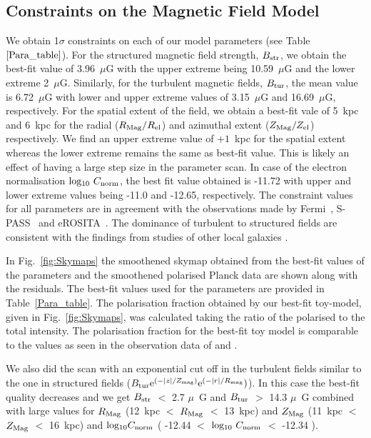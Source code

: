 \documentclass[usenatbib]{mnras}
\begin{document}
\subsection{Constraints on the Magnetic Field Model}
\label{Results}
We obtain 1$\sigma$ constraints on each of our model parameters (see Table~$\ref{Para_table}$). For the structured magnetic field strength, $B_{\rm str}$, we obtain the best-fit value of 3.96~$\mu$G with the upper extreme being 10.59~$\mu$G and the lower extreme 2~$\mu$G. Similarly, for the turbulent magnetic fields, $B_{\rm tur}$, the mean value is 6.72~$\mu$G with lower and upper extreme values of 3.15~$\mu$G and 16.69~$\mu$G, respectively. For the spatial extent of the field, we obtain a best-fit vale of  5~kpc and 6~kpc for the radial ($R_{\rm Mag}/R_{\rm el}$) and azimuthal extent ($Z_{\rm Mag}/Z_{\rm el}$) respectively. We find an upper extreme value of $+ 1$~kpc for the spatial extent whereas the lower extreme remains the same as best-fit value. This is likely an effect of having a large step size in the parameter scan. In case of the electron normalisation ${\rm log_{10}}~ C_{\rm norm}$, the best fit value obtained is -11.72 with upper and lower extreme values being -11.0 and -12.65, respectively. The constraint values for all parameters are in agreement with the observations made by Fermi~\citep{Su_2010}, S-PASS~\citep{Carretti_2013} and eROSITA~\citep{eROSITA}. The dominance of turbulent to structured fields are consistent with the findings from studies of other local galaxies \citep{Beck_NGC_6946,Tabatabaei_2008}.

In Fig.~\ref{fig:Skymaps} the smoothened skymap obtained from the best-fit values of the parameters and the smoothened polarised Planck data are shown along with the residuals. The best-fit values used for the parameters are provided in Table~\ref{Para_table}. 
The polarisation fraction obtained by our best-fit toy-model, given in Fig.~\ref{fig:Skymaps}, was calculated taking the ratio of the polarised to the total intensity. The polarisation fraction for the best-fit toy model is comparable to the values as seen in the observation data of \citet{WMAP_Page} and \citet{Carretti_2013}.

We also did the scan with an exponential cut off in the turbulent fields similar to the one in structured fields ($B_{\rm tur} {\rm{e}}^{(-|z|/Z_{\rm{mag}})} {\rm{e}}^{(-|r|/R_{\rm{mag}}})$). In this case the best-fit quality decreases and we get ${B_{\rm str}}$ $<$ 2.7 $\mu$~G and $B_{\rm tur}$ $>$ 14.3 $\mu$~G  combined with large values for $R_{\rm Mag}$ (12~kpc $<$ $R_{\rm Mag}$ $<$ 13~kpc) and $Z_{\rm Mag}$ (11~kpc $<$ $Z_{\rm Mag}$ $<$ 16~kpc) and ${\rm log_{10}} C_{\rm norm}$ ( -12.44 $<$ ${\rm log_{10}}~C_{\rm norm}$ $<$  -12.34 ).
\end{document}
